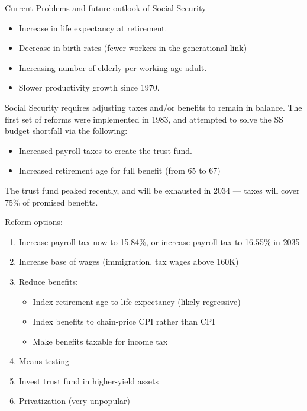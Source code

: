 \documentclass[8pt]{extarticle}
\begin{document}
  \begin{problem}{Current Problems and future outlook of Social Security}
    \begin{itemize}
      \item Increase in life expectancy at retirement.
      \item Decrease in birth rates (fewer workers in the generational link)
      \item Increasing number of elderly per working age adult.
      \item Slower productivity growth since 1970.
    \end{itemize}
    Social Security requires adjusting taxes and/or benefits to remain in balance. The first set of reforms were implemented in 1983, and attempted to solve the SS budget shortfall via the following:
    \begin{itemize}
      \item Increased payroll taxes to create the trust fund.
      \item Increased retirement age for full benefit (from 65 to 67)
    \end{itemize}
    The trust fund peaked recently, and will be exhausted in 2034 --- taxes will cover 75\% of promised benefits.\newline

    Reform options:
    \begin{enumerate}[(1)]
      \item Increase payroll tax now to 15.84\%, or increase payroll tax to 16.55\% in 2035
      \item Increase base of wages (immigration, tax wages above 160K)
      \item Reduce benefits:
        \begin{itemize}
          \item Index retirement age to life expectancy (likely regressive)
          \item Index benefits to chain-price CPI rather than CPI
          \item Make benefits taxable for income tax
        \end{itemize}
      \item Means-testing
      \item Invest trust fund in higher-yield assets
      \item Privatization (very unpopular)
    \end{enumerate}
  \end{problem}
\end{document}
